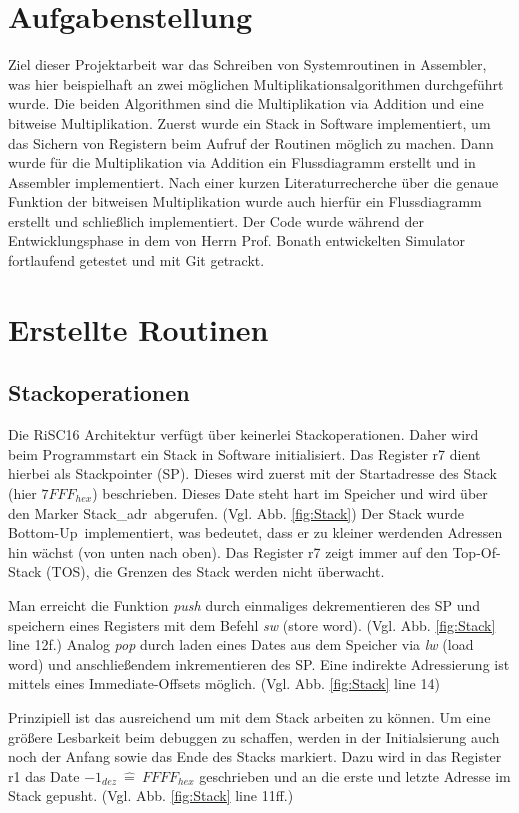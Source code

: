 \documentclass[fleqn, a4paper, 1pt]{article}       %
\begin{document}
\section{Aufgabenstellung}
Ziel dieser Projektarbeit war das Schreiben von Systemroutinen in Assembler, was hier beispielhaft an zwei möglichen Multiplikationsalgorithmen durchgeführt wurde. Die beiden Algorithmen sind die Multiplikation via Addition und eine bitweise Multiplikation. Zuerst wurde ein Stack in Software implementiert, um das Sichern von Registern beim Aufruf der Routinen möglich zu machen. Dann wurde für die Multiplikation via Addition ein Flussdiagramm erstellt und in Assembler implementiert. Nach einer kurzen Literaturrecherche über die genaue Funktion der bitweisen Multiplikation wurde auch hierfür ein Flussdiagramm erstellt und schließlich implementiert. Der Code wurde während der Entwicklungsphase in dem von Herrn Prof. Bonath entwickelten Simulator fortlaufend getestet und mit Git getrackt.

\section{Erstellte Routinen}
\subsection{Stackoperationen}

Die RiSC16 Architektur verfügt über keinerlei Stackoperationen. Daher wird beim Programmstart ein Stack in Software initialisiert. Das Register r7 dient hierbei als Stackpointer (SP). Dieses wird zuerst mit der Startadresse des Stack (hier $7FFF_{hex}$) beschrieben. Dieses Date steht hart im Speicher und wird über den Marker \glqq Stack\_adr\grqq \ abgerufen. (Vgl. Abb. \ref{fig:Stack})
Der Stack wurde  \glqq Bottom-Up\grqq \ implementiert, was bedeutet, dass er zu kleiner werdenden Adressen hin wächst (von unten nach oben). Das Register r7 zeigt immer auf den Top-Of-Stack (TOS), die Grenzen des Stack werden nicht überwacht.

Man erreicht die Funktion \emph{push}  durch einmaliges dekrementieren des SP und speichern eines Registers mit dem Befehl \emph{sw} (store word). (Vgl. Abb. \ref{fig:Stack} line 12f.) Analog \emph{pop} durch laden eines Dates aus dem Speicher via \emph{lw} (load word) und anschließendem inkrementieren des SP. Eine indirekte Adressierung ist mittels eines Immediate-Offsets möglich. (Vgl. Abb. \ref{fig:Stack} line 14) 

Prinzipiell ist das ausreichend um mit dem Stack arbeiten zu können. Um eine größere Lesbarkeit beim debuggen zu schaffen, werden in der Initialsierung auch noch der Anfang sowie das Ende des Stacks markiert. Dazu wird in das Register r1 das Date $-1_{dez}\ \widehat{=}\ FFFF_{hex}$ geschrieben und an die erste und letzte Adresse im Stack gepusht. (Vgl. Abb. \ref{fig:Stack} line 11ff.)
\end{document}
